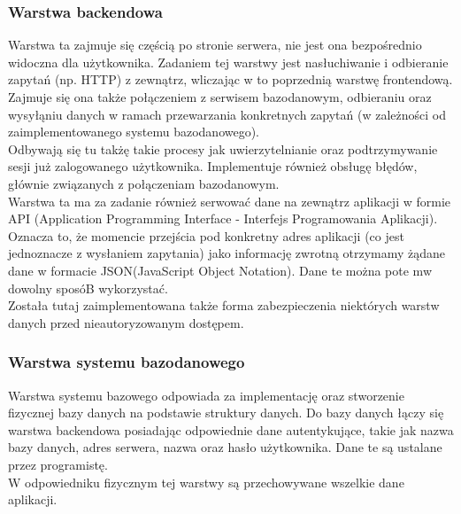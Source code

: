 \documentclass[eng,printmode]{mgr}
\begin{document}
\subsubsection{Warstwa backendowa}
Warstwa ta zajmuje się częścią po stronie serwera, nie jest ona bezpośrednio widoczna dla użytkownika. Zadaniem tej warstwy jest nasłuchiwanie i odbieranie zapytań (np. HTTP) z zewnątrz, wliczając w to poprzednią warstwę frontendową. Zajmuje się ona także połączeniem z serwisem bazodanowym, odbieraniu oraz wysyłąniu danych w ramach przewarzania konkretnych zapytań (w zależności od zaimplementowanego systemu bazodanowego).
\\
Odbywają się tu takżę takie procesy jak uwierzytelnianie oraz podtrzymywanie sesji już zalogowanego użytkownika. Implementuje również obsługę błędów, głównie związanych z połączeniam bazodanowym.
\\
Warstwa ta ma za zadanie również serwować dane na zewnątrz aplikacji w formie API (Application Programming Interface - Interfejs Programowania Aplikacji)\cite{API}. Oznacza to, że momencie przejścia pod konkretny adres aplikacji (co jest jednoznacze z wysłaniem zapytania) jako informację zwrotną otrzymamy żądane dane w formacie JSON(JavaScript Object Notation)\cite {JSON}. Dane te można pote mw dowolny sposóB wykorzystać.
\\
Została tutaj zaimplementowana także forma zabezpieczenia niektórych warstw danych przed nieautoryzowanym dostępem.
\subsubsection{Warstwa systemu bazodanowego}
Warstwa systemu bazowego odpowiada za implementację oraz stworzenie fizycznej bazy danych na podstawie struktury danych. Do bazy danych łączy się warstwa backendowa posiadając odpowiednie dane autentykujące, takie jak nazwa bazy danych, adres serwera, nazwa oraz hasło użytkownika. Dane te są ustalane przez programistę.
\\
W odpowiedniku fizycznym tej warstwy są przechowywane wszelkie dane aplikacji.
\end{document}
